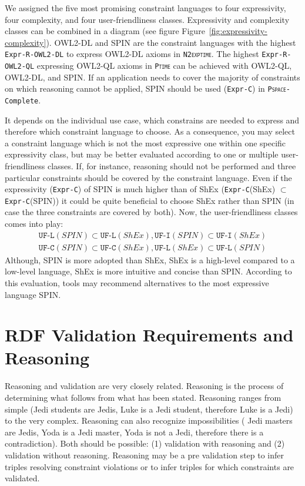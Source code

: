 \documentclass{llncs}
\newcommand{\ms}[1]{\texttt{#1}}
\begin{document}
We assigned the five most promising constraint languages to four expressivity, four complexity, and four user-friendliness classes.
Expressivity and complexity classes can be combined in a diagram (see figure Figure~\ref{fig:expressivity-complexity}).
OWL2-DL and SPIN are the constraint languages with the highest \ms{Expr-R-OWL2-DL} to express OWL2-DL axioms in \ms{\textsc{N2exptime}}.
The highest \ms{Expr-R-OWL2-QL} expressing OWL2-QL axioms in \ms{\textsc{Ptime}} can be achieved with OWL2-QL, OWL2-DL, and SPIN.
If an application needs to cover the majority of constraints on which reasoning cannot be applied, SPIN should be used (\ms{Expr-C}) in \ms{\textsc{Pspace}-Complete}.

It depends on the individual use case, which constrains are needed to express and therefore which constraint language to choose.
As a consequence, you may select a constraint language which is not the most expressive one within one specific expressivity class, 
but may be better evaluated according to one or multiple user-friendliness classes.
If, for instance, reasoning should not be performed and three particular constraints should be covered by the constraint language.
Even if the expressivity (\ms{Expr-C}) of SPIN is much higher than of ShEx (\ms{Expr-C}(ShEx) $\subset$ \ms{Expr-C}(SPIN)) 
it could be quite beneficial to choose ShEx rather than SPIN (in case the three constraints are covered by both).
Now, the user-friendliness classes comes into play:
\begin{eqnarray*}
\ms{UF-L}(SPIN) \subset \ms{UF-L}(ShEx), \ms{UF-I}(SPIN) \subset \ms{UF-I}(ShEx) \\
\ms{UF-C}(SPIN) \subset \ms{UF-C}(ShEx), \ms{UF-L}(ShEx) \subset \ms{UF-L}(SPIN)
\end{eqnarray*}
Although, SPIN is more adopted than ShEx, ShEx is a high-level compared to a low-level language, ShEx is more intuitive and concise than SPIN.
According to this evaluation, tools may recommend alternatives to the most expressive language SPIN.  

\section{RDF Validation Requirements and Reasoning}
\label{sec:rdf-validation-requirements-and-reasoning}

Reasoning and validation are very closely related. 
Reasoning is the process of determining what follows from what has been
stated.  Reasoning ranges from simple (Jedi students are Jedis, Luke is a Jedi student, therefore Luke is a Jedi) to the very complex. Reasoning can
also recognize impossibilities ( Jedi masters are Jedis, Yoda is a Jedi master, Yoda
is not a Jedi, therefore there is a contradiction). 
Both should be possible: (1) validation with reasoning and (2) validation without reasoning. 
Reasoning may be a pre validation step to infer triples resolving constraint violations or to infer triples for which constraints are validated.
\end{document}
